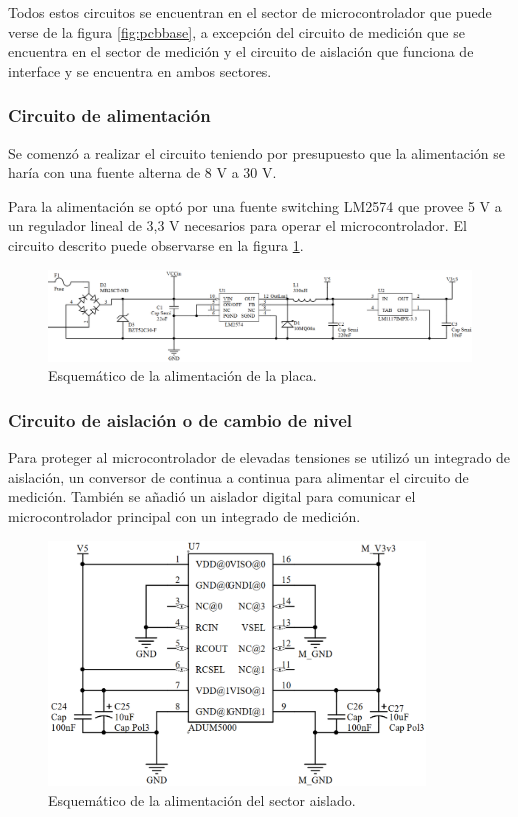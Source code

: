 Todos estos circuitos se encuentran en el sector de microcontrolador que puede verse de la figura \ref{fig:pcbbase}, a excepción del circuito de  medición que se encuentra en el sector de medición  y el circuito de aislación que funciona de interface y se encuentra en ambos sectores.

\subsubsection{Circuito de alimentación}
Se comenzó a realizar el circuito teniendo por presupuesto que la alimentación se haría con una fuente alterna de 8 V a 30 V.

Para la alimentación se optó por una fuente switching  LM2574 que provee 5 V a un regulador lineal de 3,3 V necesarios para operar el microcontrolador. El circuito descrito puede observarse en la figura \ref{fig:circalim1}.

\begin{figure}[h]
	\centering
	\includegraphics[width=120mm,keepaspectratio]{Figures/alimentacion1.png}
	\caption{Esquemático de la alimentación de la placa.}
	\label{fig:circalim1}
\end{figure}

\subsubsection{Circuito de aislación o de cambio de nivel}
Para proteger al microcontrolador de elevadas tensiones se utilizó un integrado de aislación, un conversor de continua a continua para alimentar el circuito de medición. También se añadió un aislador digital para comunicar el microcontrolador principal con un integrado de medición.

\begin{figure}[h]
	\centering
	\includegraphics[width=100mm,keepaspectratio]{Figures/alimentacion2.png}
	\caption{Esquemático de la alimentación del sector aislado.}
	\label{fig:circaisl1}
\end{figure}

